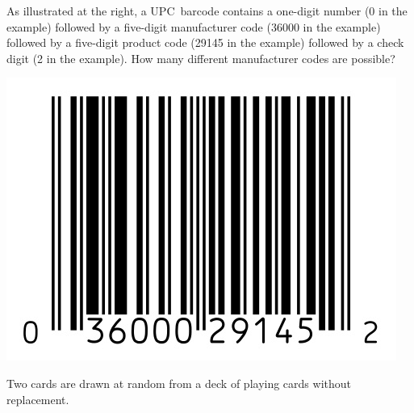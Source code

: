 \documentclass[addpoints,12pt]{exam}
\begin{document}
\begin{questions}

\begin{multicols}{2}
\question[10]
As illustrated at the right,
a UPC~barcode contains a one-digit number
(0 in the example) followed by a five-digit
manufacturer code (36000 in the example)
followed by a five-digit product code
(29145 in the example) followed by a check
digit (2 in the example). How many different
manufacturer codes are possible?
\break\\
\begin{center}\includegraphics[scale=.5]{Barcode}\end{center}
\end{multicols}

\question[16] Two cards are drawn at random from a deck of playing cards
without replacement.


\end{questions}
\end{document}
